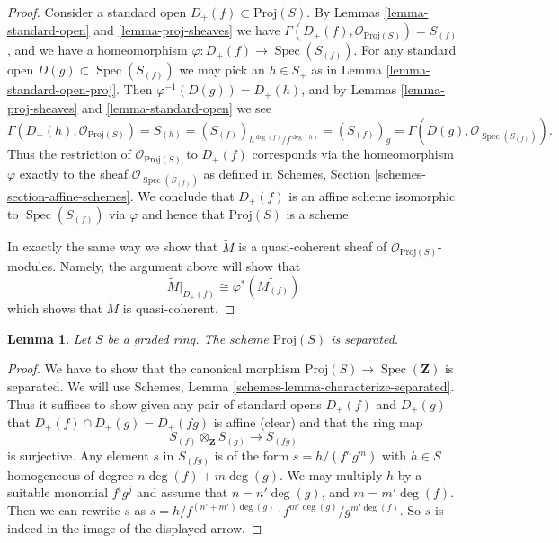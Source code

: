\documentclass{stacks-project}
\theoremstyle{plain}
\newtheorem{lemma}[subsection]{Lemma}
\theoremstyle{definition}
\theoremstyle{remark}
\numberwithin{equation}{subsection}
\def\Spec{\mathop{\mathrm{Spec}}}
\begin{document}
\begin{proof}
Consider a standard open $D_{+}(f) \subset \text{Proj}(S)$.
By Lemmas \ref{lemma-standard-open} and \ref{lemma-proj-sheaves}
we have $\Gamma(D_{+}(f), \mathcal{O}_{\text{Proj}(S)}) = S_{(f)}$, and
we have a homeomorphism $\varphi : D_{+}(f) \to \Spec(S_{(f)})$.
For any standard open $D(g) \subset \Spec(S_{(f)})$ we may
pick an $h \in S_{+}$ as in Lemma \ref{lemma-standard-open-proj}.
Then $\varphi^{-1}(D(g)) = D_{+}(h)$, and by
Lemmas \ref{lemma-proj-sheaves} and \ref{lemma-standard-open} we see
$$
\Gamma(D_{+}(h), \mathcal{O}_{\text{Proj}(S)})
=
S_{(h)}
=
(S_{(f)})_{h^{\deg(f)}/f^{\deg(h)}}
=
(S_{(f)})_g
=
\Gamma(D(g), \mathcal{O}_{\Spec(S_{(f)})}).
$$
Thus the restriction of $\mathcal{O}_{\text{Proj}(S)}$ to
$D_{+}(f)$ corresponds via the homeomorphism $\varphi$
exactly to the sheaf $\mathcal{O}_{\Spec(S_{(f)})}$
as defined in Schemes, Section \ref{schemes-section-affine-schemes}.
We conclude that $D_{+}(f)$ is an affine scheme isomorphic to
$\Spec(S_{(f)})$ via $\varphi$ and
hence that $\text{Proj}(S)$ is a scheme.

\medskip\noindent
In exactly the same way we show that $\widetilde M$ is a
quasi-coherent sheaf of $\mathcal{O}_{\text{Proj}(S)}$-modules.
Namely, the argument above will show that
$$
\widetilde M|_{D_{+}(f)} \cong \varphi^*\left(\widetilde{M_{(f)}}\right)
$$
which shows that $\widetilde M$ is quasi-coherent.
\end{proof}

\begin{lemma}
\label{lemma-proj-separated}
Let $S$ be a graded ring.
The scheme $\text{Proj}(S)$ is separated.
\end{lemma}

\begin{proof}
We have to show that the canonical morphism
$\text{Proj}(S) \to \Spec(\mathbf{Z})$
is separated.
We will use Schemes, Lemma \ref{schemes-lemma-characterize-separated}.
Thus it suffices to show given any pair of standard opens
$D_{+}(f)$ and $D_{+}(g)$ that $D_{+}(f) \cap D_{+}(g) = D_{+}(fg)$
is affine (clear) and that the ring map
$$
S_{(f)} \otimes_{\mathbf{Z}} S_{(g)} \longrightarrow S_{(fg)}
$$
is surjective. Any element $s$ in $S_{(fg)}$ is of
the form $s = h/(f^ng^m)$ with $h \in S$ homogeneous of degree
$n\deg(f) + m\deg(g)$. We may multiply $h$ by a suitable
monomial $f^ig^j$ and assume that $n = n' \deg(g)$, and
$m = m' \deg(f)$. Then we can rewrite $s$ as
$s = h/f^{(n' + m')\deg(g)} \cdot f^{m'\deg(g)}/g^{m'\deg(f)}$.
So $s$ is indeed in the image of the displayed arrow.
\end{proof}
\end{document}
